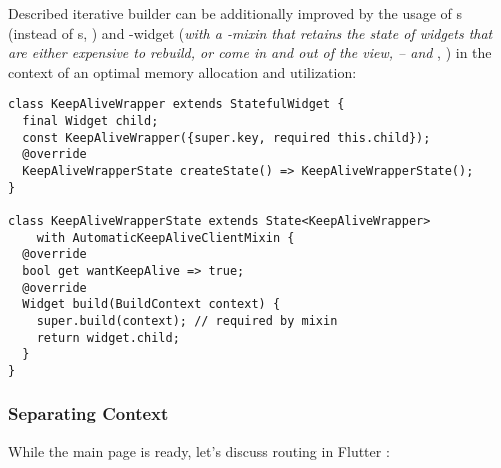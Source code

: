 \hspace{0.5cm}
\hspace{1cm}

\noindent Described iterative builder can be additionally improved by the usage of s (instead of s, 
) and -widget (\emph{with a -mixin that retains the 
state of widgets that are either expensive to rebuild, or come in and out of the view, --  and 
}, ) in the context of an optimal memory allocation and utilization:

\begin{lstlisting}
class KeepAliveWrapper extends StatefulWidget {
  final Widget child;
  const KeepAliveWrapper({super.key, required this.child});
  @override
  KeepAliveWrapperState createState() => KeepAliveWrapperState();
}

class KeepAliveWrapperState extends State<KeepAliveWrapper> 
    with AutomaticKeepAliveClientMixin {
  @override
  bool get wantKeepAlive => true;
  @override
  Widget build(BuildContext context) {
    super.build(context); // required by mixin
    return widget.child;
  }
}
\end{lstlisting}


\subsubsection{Separating Context}

\noindent While the main page is ready, let's discuss routing in Flutter :

